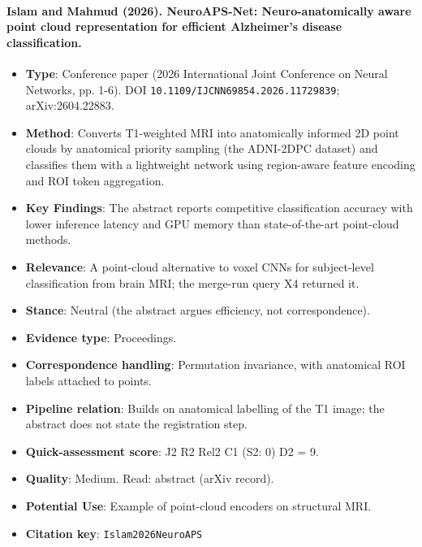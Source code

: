 \documentclass[journal,onecolumn]{IEEEtran}
\begin{document}
\paragraph{Islam and Mahmud (2026). NeuroAPS-Net: Neuro-anatomically aware point cloud representation for efficient Alzheimer's disease classification.~\cite{Islam2026NeuroAPS}}\mbox{}

\begin{itemize}

\item{} \textbf{Type}: Conference paper (2026 International Joint Conference on Neural Networks, pp. 1-6). DOI \nolinkurl{10.1109/IJCNN69854.2026.11729839}; arXiv:2604.22883.

\item{} \textbf{Method}: Converts T1-weighted MRI into anatomically informed 2D point clouds by anatomical priority sampling (the ADNI-2DPC dataset) and classifies them with a lightweight network using region-aware feature encoding and ROI token aggregation.

\item{} \textbf{Key Findings}: The abstract reports competitive classification accuracy with lower inference latency and GPU memory than state-of-the-art point-cloud methods.

\item{} \textbf{Relevance}: A point-cloud alternative to voxel CNNs for subject-level classification from brain MRI; the merge-run query X4 returned it.

\item{} \textbf{Stance}: Neutral (the abstract argues efficiency, not correspondence).

\item{} \textbf{Evidence type}: Proceedings.

\item{} \textbf{Correspondence handling}: Permutation invariance, with anatomical ROI labels attached to points.

\item{} \textbf{Pipeline relation}: Builds on anatomical labelling of the T1 image; the abstract does not state the registration step.

\item{} \textbf{Quick-assessment score}: J2 R2 Rel2 C1 (S2: 0) D2 = 9.

\item{} \textbf{Quality}: Medium. Read: abstract (arXiv record).

\item{} \textbf{Potential Use}: Example of point-cloud encoders on structural MRI.

\item{} \textbf{Citation key}: \texttt{Islam2026NeuroAPS}

\end{itemize}
\end{document}

